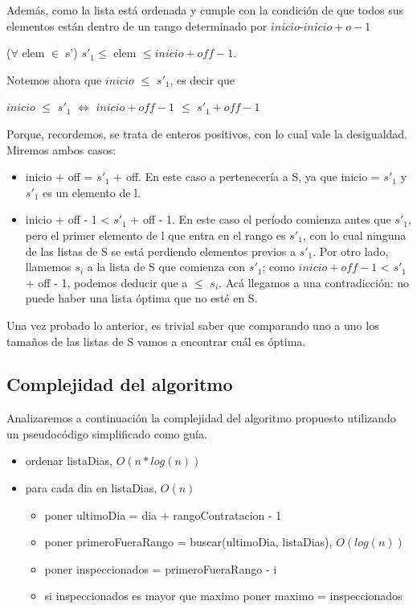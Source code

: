Adem\'as, como la lista est\'a ordenada y cumple con la condici\'on de que todos sus elementos est\'an dentro de un rango determinado por $inicio$-$inicio + o - 1$\\
\begin{center}
($\forall$ elem $\in$ s') $s'_1 \leq$ elem $\leq inicio + off - 1$.\\
\end{center}

Notemos ahora que $inicio$ $\leq$ $s'_1$, es decir que \\ 
\begin{center}
$inicio$ $\leq$ $s'_1$ $\Leftrightarrow$ $inicio + off - 1$ $\leq$ $s'_1 + off - 1$
\end{center}
Porque, recordemos, se trata de enteros positivos, con lo cual vale la desigualdad.\\

Miremos ambos casos:
\begin{itemize}
\item inicio + off = $s'_1$ + off. En este caso a pertenecer\'ia a S, ya que inicio = $s'_1$ y $s'_1$ es un elemento de l.
\item inicio + off - 1 < $s'_1$ + off - 1. En este caso el per\'iodo comienza antes que $s'_1$, pero el primer elemento de l que entra en el rango es $s'_1$, con lo cual ninguna de las listas de S se est\'a perdiendo elementos previos a $s'_1$. Por otro lado, llamemos $s_i$ a la lista de S que comienza con $s'_1$; como $inicio + off - 1$ < $s'_1$ + off - 1, podemos deducir que a $\leq$ $ s_i$. Ac\'a llegamos a una contradicci\'on: no puede haber una lista \'optima que no est\'e en S.
\end{itemize}

Una vez probado lo anterior, es trivial saber que comparando uno a uno los tama\~nos de las listas de S vamos a encontrar cu\'al es \'optima.\\

\subsection{Complejidad del algoritmo}

Analizaremos a continuaci\'on la complejidad del algoritmo propuesto utilizando un pseudoc\'odigo simplificado como gu\'ia.

\begin{itemize}
\item ordenar listaDias, $O(n*log(n))$
\item para cada dia en listaDias, $O(n)$
\begin{itemize}
	\item poner ultimoDia = dia + rangoContratacion - 1
	\item poner primeroFueraRango = buscar(ultimoDia, listaDias), $O(log(n))$
	\item poner inspeccionados = primeroFueraRango - i
	\item si inspeccionados es mayor que maximo poner maximo = inspeccionados
\end{itemize}
\end{itemize}

